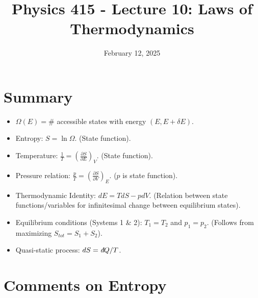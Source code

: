 \documentclass[11pt]{article}
\title{Physics 415 - Lecture 10: Laws of Thermodynamics}
\date{February 12, 2025}
\author{} %
\newcommand{\pderiv}[2]{\frac{\partial #1}{\partial #2}}
\newcommand{\deltaE}{\delta E}
\newcommand{\ethbar}{\text{\it{đ}}} %
\begin{document}
\maketitle
\thispagestyle{empty}

\section*{Summary}

\begin{itemize}
    \item $\Omega(E) = \#$ accessible states with energy $(E, E+\deltaE)$.
    \item Entropy: $S = \ln \Omega$. (State function).
    \item Temperature: $\frac{1}{T} = \left( \pderiv{S}{E} \right)_V$. (State function).
    \item Pressure relation: $\frac{p}{T} = \left( \pderiv{S}{V} \right)_E$. ($p$ is state function).
    \item Thermodynamic Identity: $dE = T dS - p dV$. (Relation between state functions/variables for infinitesimal change between equilibrium states).
    \item Equilibrium conditions (Systems 1 \& 2): $T_1=T_2$ and $p_1=p_2$. (Follows from maximizing $S_{tot} = S_1+S_2$).
    \item Quasi-static process: $dS = \ethbar Q / T$.
\end{itemize}

\section*{Comments on Entropy}
\end{document}
